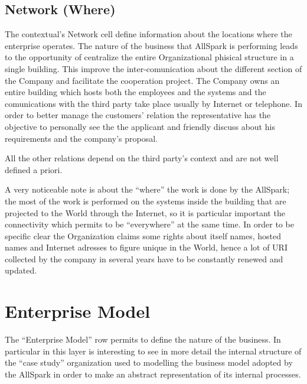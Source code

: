 \subsection{Network (Where)}
\label{subsec:scope[Network]}
The contextual's Network cell define information about the locations where the enterprise operates. The nature of the business that AllSpark is performing leads to the opportunity of centralize the entire Organizational phisical structure in a single building. This improve the inter-comunication about the different section of the Company and facilitate the cooperation project. The Company owns an entire building which hosts both the employees and the systems and the comunications with the third party take place usually by Internet or telephone. In order to better manage the customers' relation the representative has the objective to personally see the the applicant and friendly discuss about his requirements and the company's proposal.


All the other relations depend on the third party's context and are not well defined a priori.


A very noticeable note is about the ``where'' the work is done by the AllSpark; the most of the work is performed on the systems inside the building that are projected to the World through the Internet, so it is particular important the connectivity which permits to be ``everywhere'' at the same time. In order to be specific clear the Organization claims some rights about itself names, hosted names and Internet adresses to figure unique in the World, hence a lot of URI collected by the company in several years have to be constantly renewed and updated.



\section{Enterprise Model}
\label{sec:Enterprise}
The ``Enterprise Model'' row permits to define the nature of the business. In particular in this layer is interesting to see in more detail the internal structure of the ``case study'' organization used to modelling the business model adopted by the AllSpark in order to make an abstract representation of its internal processes.

